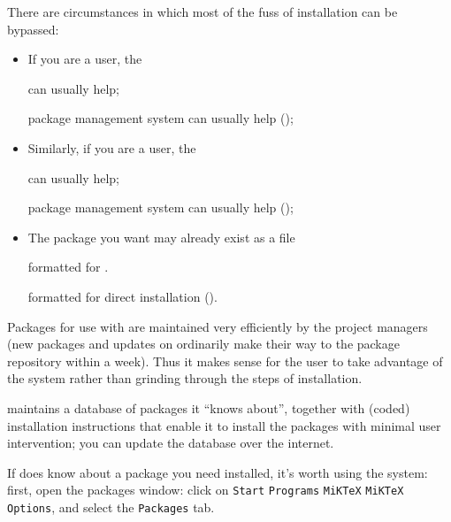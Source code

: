 There are circumstances in which most of the fuss of installation can
be bypassed:
\begin{itemize}
\item If you are a \miktex{} user, the 
\begin{hyperversion}
  can usually help;
\end{hyperversion}
\begin{flatversion}
  \miktex{} package management system can usually help
  ();
\end{flatversion}
\item Similarly, if you are a \texlive{} user, the 
\begin{hyperversion}
  can usually help;
\end{hyperversion}
\begin{flatversion}
  \texlive{} package management system can usually help
  ();
\end{flatversion}
\item The package you want may already exist as a  file
\begin{wideversion}
  formatted for .
\end{wideversion}
\begin{narrowversion}
  formatted for direct installation ().
\end{narrowversion}
\end{itemize}


Packages for use with \miktex{} are maintained very efficiently by the
project managers (new packages and updates on  ordinarily
make their way to the \miktex{} package repository within a week).
Thus it makes sense for the \miktex{} user to take advantage of the
system rather than grinding through the steps of installation.

\miktex{} maintains a database of packages it ``knows about'',
together with (coded) installation instructions that enable it to
install the packages with minimal user intervention; you can update
the database over the internet.

If \miktex{} does know about a package you need installed, it's worth
using the system:
first, open the \miktex{} packages window: click on
  \texttt{Start}\arrowhyph{}%
  \texttt{Programs}\arrowhyph{}%
  \texttt{MiKTeX}\arrowhyph{}%
  \texttt{MiKTeX Options}, and select the
  \texttt{Packages} tab.
  

